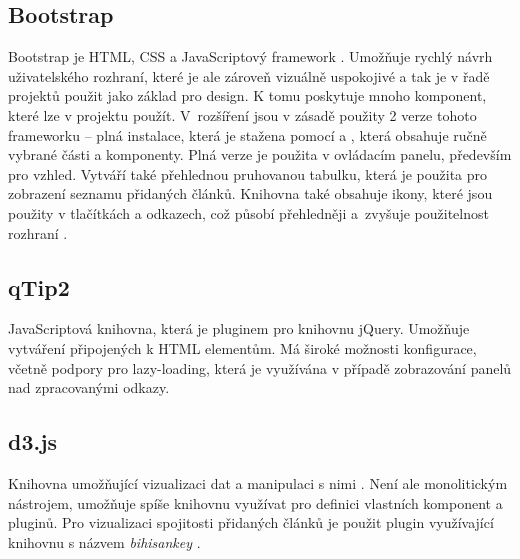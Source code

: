 \subsection{Bootstrap}
Bootstrap je HTML, CSS a JavaScriptový framework \cite{bootstrap}. Umožňuje rychlý návrh uživatelského rozhraní, které je ale zároveň vizuálně uspokojivé a tak je v řadě projektů použit jako základ pro design. K tomu poskytuje mnoho komponent, které lze v projektu použít. V~rozšíření jsou v zásadě použity 2 verze tohoto frameworku -- plná instalace, která je stažena pomocí  a , která obsahuje ručně vybrané části a komponenty. Plná verze je použita v ovládacím panelu, především pro vzhled. Vytváří také přehlednou pruhovanou tabulku, která je použita pro zobrazení seznamu přidaných článků. Knihovna také obsahuje ikony, které jsou použity v tlačítkách a odkazech, což působí přehledněji a~zvyšuje použitelnost rozhraní \cite{iconusability}. 

\subsection{qTip2}
JavaScriptová knihovna, která je pluginem pro knihovnu jQuery. Umožňuje vytváření  připojených k HTML elementům. Má široké možnosti konfigurace, včetně podpory pro lazy-loading, která je využívána v případě zobrazování panelů nad zpracovanými odkazy.

\subsection{d3.js}
Knihovna umožňující vizualizaci dat a manipulaci s nimi \cite{d3js}. Není ale monolitickým nástrojem, umožňuje spíše knihovnu využívat pro definici vlastních komponent a pluginů. Pro vizualizaci spojitosti přidaných článků je použit plugin využívající knihovnu s názvem \textit{bihisankey} \cite{bihisankey}.

